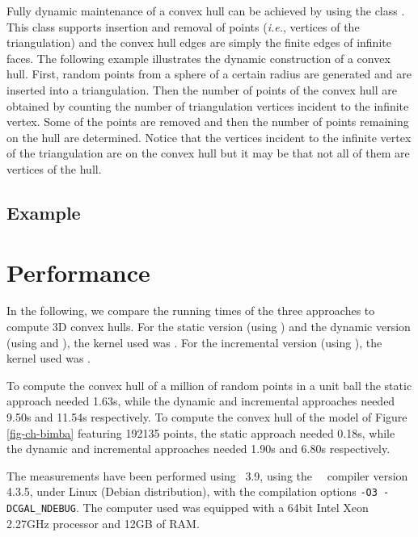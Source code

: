 Fully dynamic maintenance of a convex hull can be achieved by using the
class .  This class supports insertion
and removal of points (\textit{i.e.}, vertices of the triangulation) and the 
convex hull edges are simply the finite edges of infinite faces.  
The following example illustrates the dynamic construction of a convex hull.
First, random points from a sphere of a certain radius are generated and are
inserted into a triangulation.  Then the number of points of the convex hull 
are obtained by counting the number of triangulation vertices incident to the 
infinite vertex.  Some of the points are removed and then the number of points 
remaining on the hull are determined.  Notice that the vertices incident to the
infinite vertex of the triangulation are on the convex hull but it may be that
not all of them are vertices of the hull.

\subsection{Example}

\section{Performance}

In the following, we compare the running times of the three approaches to compute 3D convex hulls.
For the static version (using ) and the dynamic version
(using  and ), the kernel
used was . For the incremental version
(using ), the kernel used was .

To compute the convex hull of a million of random points in a unit ball the static approach needed 1.63s, while 
the dynamic and incremental approaches needed 9.50s and 11.54s respectively.
To compute the convex hull of the model of Figure \ref{fig-ch-bimba} featuring 192135 points, 
the static approach needed 0.18s, while the dynamic and incremental approaches needed 1.90s and 6.80s respectively.

The measurements have been performed using \cgal\ 3.9, using the \gnu\ \CC\  compiler version 4.3.5, under Linux (Debian distribution),
with the compilation options \texttt{-O3 -DCGAL\_NDEBUG}. The computer used was equipped with a 64bit Intel Xeon 2.27GHz processor and 12GB of RAM.